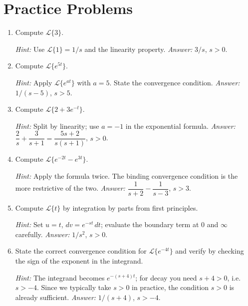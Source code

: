 \documentclass[12pt,a4paper]{article}
\begin{document}
\section{Practice Problems}

\begin{enumerate}[leftmargin=1.5cm, label=\textbf{P\arabic*.}]

  \item Compute $\mathcal{L}\{3\}$.

  \textit{Hint:} Use $\mathcal{L}\{1\} = 1/s$ and the linearity property.
  \quad \textit{Answer:} $3/s$, \; $s > 0$.

  \item Compute $\mathcal{L}\{e^{5t}\}$.

  \textit{Hint:} Apply $\mathcal{L}\{e^{at}\}$ with $a = 5$. State the
  convergence condition.
  \quad \textit{Answer:} $1/(s-5)$, \; $s > 5$.

  \item Compute $\mathcal{L}\{2 + 3e^{-t}\}$.

  \textit{Hint:} Split by linearity; use $a = -1$ in the exponential formula.
  \quad \textit{Answer:} $\dfrac{2}{s} + \dfrac{3}{s+1} = \dfrac{5s+2}{s(s+1)}$,
  \; $s > 0$.

  \item Compute $\mathcal{L}\{e^{-2t} - e^{3t}\}$.

  \textit{Hint:} Apply the formula twice. The binding convergence condition
  is the more restrictive of the two.
  \quad \textit{Answer:} $\dfrac{1}{s+2} - \dfrac{1}{s-3}$, \; $s > 3$.

  \item Compute $\mathcal{L}\{t\}$ by integration by parts from first
        principles.

  \textit{Hint:} Set $u = t$, $dv = e^{-st}\, dt$; evaluate the boundary
  term at 0 and $\infty$ carefully.
  \quad \textit{Answer:} $1/s^2$, \; $s > 0$.

  \item State the correct convergence condition for $\mathcal{L}\{e^{-4t}\}$
        and verify by checking the sign of the exponent in the integrand.

  \textit{Hint:} The integrand becomes $e^{-(s+4)t}$; for decay you need
  $s + 4 > 0$, i.e.\ $s > -4$. Since we typically take $s > 0$ in practice,
  the condition $s > 0$ is already sufficient.
  \quad \textit{Answer:} $1/(s+4)$, \; $s > -4$.

\end{enumerate}
\end{document}
